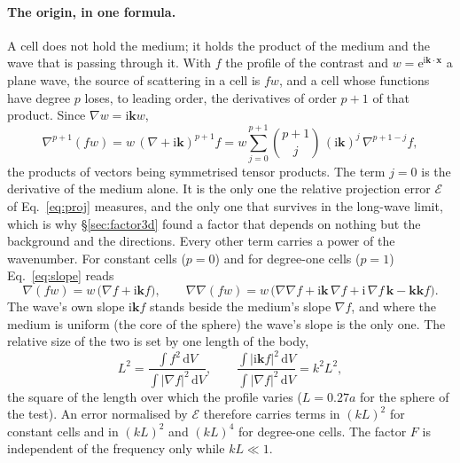 \documentclass[11pt,a4paper]{article}
\newcommand{\bk}{\mathbf{k}}
\newcommand{\bx}{\mathbf{x}}
\newcommand{\cE}{\mathcal{E}}
\newcommand{\dd}{\mathrm{d}}
\begin{document}
\paragraph{The origin, in one formula.} A cell does not hold the medium; it holds the product of the
medium and the wave that is passing through it. With $f$ the profile of the contrast and
$w=\mathrm{e}^{\mathrm{i}\bk\cdot\bx}$ a plane wave, the source of scattering in a cell is $fw$, and a cell
whose functions have degree $p$ loses, to leading order, the derivatives of order $p+1$ of that product.
Since $\nabla w=\mathrm{i}\bk w$,
\begin{equation}\label{eq:slope}
  \nabla^{p+1}(fw)=w\,(\nabla+\mathrm{i}\bk)^{p+1}f
  =w\sum_{j=0}^{p+1}\binom{p+1}{j}\,(\mathrm{i}\bk)^{j}\,\nabla^{p+1-j}f ,
\end{equation}
the products of vectors being symmetrised tensor products. The term $j=0$ is the derivative of the medium
alone. It is the only one the relative projection error $\cE$ of Eq.~\eqref{eq:proj} measures, and the
only one that survives in the long-wave limit, which is why \S\ref{sec:factor3d} found a factor that
depends on nothing but the background and the directions. Every other term carries a power of the
wavenumber. For constant cells ($p=0$) and for degree-one cells ($p=1$) Eq.~\eqref{eq:slope} reads
\begin{equation}\label{eq:slope01}
  \nabla(fw)=w\,\bigl(\nabla f+\mathrm{i}\bk f\bigr),\qquad
  \nabla\nabla(fw)=w\,\bigl(\nabla\nabla f+\mathrm{i}\bk\,\nabla f+\mathrm{i}\,\nabla f\,\bk-\bk\bk f\bigr).
\end{equation}
The wave's own slope $\mathrm{i}\bk f$ stands beside the medium's slope $\nabla f$, and where the medium
is uniform (the core of the sphere) the wave's slope is the only one. The relative size of the two is set
by one length of the body,
\begin{equation}\label{eq:L2}
  L^2=\frac{\int f^2\,\dd V}{\int\lvert\nabla f\rvert^2\,\dd V},\qquad
  \frac{\int\lvert\mathrm{i}\bk f\rvert^2\,\dd V}{\int\lvert\nabla f\rvert^2\,\dd V}=k^2L^2 ,
\end{equation}
the square of the length over which the profile varies ($L=0.27a$ for the sphere of the test). An error
normalised by $\cE$ therefore carries terms in $(kL)^2$ for constant cells and in $(kL)^2$ and $(kL)^4$
for degree-one cells. The factor $F$ is independent of the frequency only while $kL\ll1$.
\end{document}

